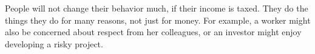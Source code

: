 People will not change their behavior much, if their income is taxed. They do the things they do for many reasons, not just for money. For example, a worker might also be concerned about respect from her colleagues, or an investor might enjoy developing a risky project.
